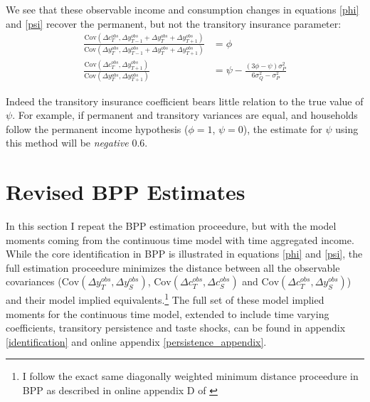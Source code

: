 \documentclass[AER]{AEA}
\begin{document}
We see that these observable income and consumption changes in equations \ref{phi} and \ref{psi} recover the permanent, but not the transitory insurance parameter:
\begin{align}
\frac{\mathrm{Cov}(\Delta c^{obs}_{T}, \Delta y^{obs}_{T-1}+\Delta y^{obs}_{T}+\Delta y^{obs}_{T+1})}{\mathrm{Cov}(\Delta y^{obs}_{T}, \Delta y^{obs}_{T-1}+\Delta y^{obs}_{T}+\Delta y^{obs}_{T+1})}&= \phi \label{phi_same}\\
\frac{\mathrm{Cov}(\Delta c^{obs}_{T},\Delta y^{obs}_{T+1})}{\mathrm{Cov}(\Delta y^{obs}_{T},\Delta y^{obs}_{T+1})} &= \psi - \frac{ (3\phi - \psi) \sigma^2_P}{6\sigma^2_Q-\sigma^2_P} \label{not_psi}
\end{align}

Indeed the transitory insurance coefficient bears little relation to the true value of $\psi$. For example, if permanent and transitory variances are equal, and households follow the permanent income hypothesis ($\phi=1$, $\psi=0$), the estimate for $\psi$ using this method will be \textit{negative} 0.6.

\section{Revised BPP Estimates} \label{evidence}

In this section I repeat the BPP estimation proceedure, but with the model moments coming from the continuous time model with time aggregated income. While the core identification in BPP is illustrated in equations \ref{phi} and \ref{psi}, the full estimation proceedure minimizes the distance between all the observable covariances ($ \mathrm{Cov}(\Delta y^{obs}_T, \Delta y^{obs}_S)$, $\mathrm{Cov}(\Delta c^{obs}_T, \Delta c^{obs}_S)$ and $\mathrm{Cov}(\Delta c^{obs}_T,  \Delta y^{obs}_S)$) and their model implied equivalents.\footnote{I follow the exact same diagonally weighted minimum distance proceedure in BPP as described in online appendix D of \cite{blundell_consumption_2008}} The full set of these model implied moments for the continuous time model, extended to include time varying coefficients, transitory persistence and taste shocks, can be found in appendix \ref{identification} and online appendix \ref{persistence_appendix}. 


\end{document}
